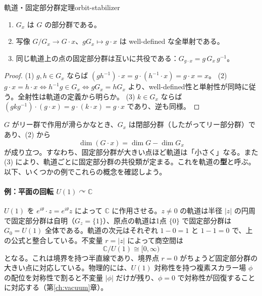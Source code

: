 \documentclass[uplatex, dvipdfmx, book]{jsbook}
\begin{document}
\begin{myprop}{軌道・固定部分群定理}{orbit-stabilizer}
\begin{enumerate}
    \item $G_x$ は $G$ の部分群である。
    \item 写像 $G/G_x \to G \cdot x$、$g G_x \mapsto g \cdot x$ は well-defined な全単射である。
    \item 同じ軌道上の点の固定部分群は互いに共役である：$G_{g \cdot x} = g\, G_x\, g^{-1}$。
\end{enumerate}
\end{myprop}
\begin{proof}
(1) $g, h \in G_x$ ならば $(gh^{-1}) \cdot x = g \cdot (h^{-1} \cdot x) = g \cdot x = x$。
(2) $g \cdot x = h \cdot x \iff h^{-1}g \in G_x \iff g G_x = h G_x$ より、well-defined性と単射性が同時に従う。全射性は軌道の定義から明らか。
(3) $k \in G_x$ ならば $(g k g^{-1}) \cdot (g \cdot x) = g \cdot (k \cdot x) = g \cdot x$ であり、逆も同様。
\end{proof}

$G$ がリー群で作用が滑らかなとき、$G_x$ は閉部分群（したがってリー部分群）であり、(2) から
\begin{equation}
    \dim (G \cdot x) = \dim G - \dim G_x
\end{equation}
が成り立つ。すなわち、固定部分群が大きい点ほど軌道は「小さく」なる。また (3) により、軌道ごとに固定部分群の共役類が定まる。これを軌道の\textbf{型}と呼ぶ。以下、いくつかの例でこれらの概念を確認しよう。

\paragraph{例：平面の回転 $U(1) \curvearrowright \mathbb{C}$}
$U(1)$ を $e^{i\theta} \cdot z = e^{i\theta} z$ によって $\mathbb{C}$ に作用させる。$z \neq 0$ の軌道は半径 $|z|$ の円周で固定部分群は自明（$G_z = \{1\}$）、原点の軌道は1点 $\{0\}$ で固定部分群は $G_0 = U(1)$ 全体である。軌道の次元はそれぞれ $1 - 0 = 1$ と $1 - 1 = 0$ で、上の公式と整合している。不変量 $r = |z|$ によって商空間は
\begin{equation}
    \mathbb{C}/U(1) \cong [0, \infty)
\end{equation}
となる。これは境界を持つ半直線であり、境界点 $r = 0$ がちょうど固定部分群の大きい点に対応している。物理的には、$U(1)$ 対称性を持つ複素スカラー場 $\phi$ の配位を対称性で割ると不変量 $|\phi|$ だけが残り、$\phi = 0$ で対称性が回復することに対応する（第\ref{ch:vacuum}章）。
\end{document}

